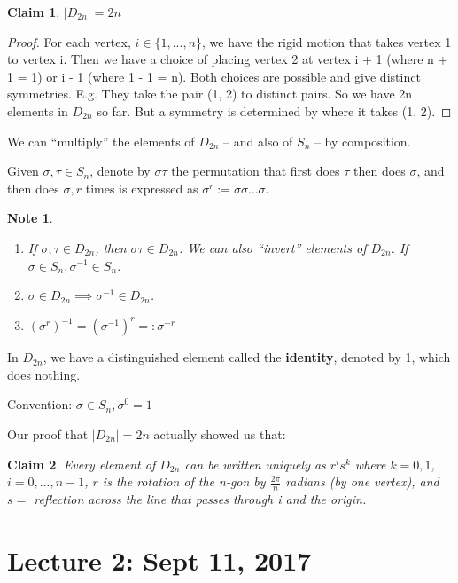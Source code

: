 \documentclass[11pt, oneside]{book}
\theoremstyle{break}
\newtheorem*{proof}{Proof}
\newtheorem{claim}{Claim}[section]
\newtheorem*{note}{Note}
\begin{document}
\begin{claim}
	$|D_{2n}| = 2n$
\end{claim}

\begin{proof}
	For each vertex, $i \in \{1, ..., n\}$, we have the rigid motion that takes vertex 1 to vertex i. Then we have a choice of placing vertex 2 at vertex i + 1 (where n + 1 = 1) or i - 1 (where 1 - 1 = n). Both choices are possible and give distinct symmetries. E.g. They take the pair (1, 2) to distinct pairs. So we have 2n elements in $D_{2n}$ so far. But a symmetry is determined by where it takes (1, 2).
\end{proof}

We can ``multiply'' the elements of $D_{2n}$ -- and also of $S_n$ -- by composition.

Given $\sigma, \tau \in S_n$, denote by $\sigma\tau$ the permutation that first does $\tau$ then does $\sigma$, and then does $\sigma, r$ times is expressed as
$\sigma^r := \sigma\sigma\hdots\sigma$.

\begin{note}
    \begin{enumerate}
        \item If $\sigma, \tau \in D_{2n}$, then $\sigma\tau \in D_{2n}$. We can also ``invert'' elements of $D_{2n}$. If $\sigma \in S_n, \sigma^{-1} \in S_n$.
        \item $\sigma \in D_{2n} \implies \sigma^{-1} \in D_{2n}$.
        \item $(\sigma^r)^{-1} = (\sigma^{-1})^r =: \sigma^{-r}$
    \end{enumerate}
\end{note}

In $D_{2n}$, we have a distinguished element called the \textbf{identity}, denoted by 1, which does nothing.

Convention: $\sigma \in S_n, \sigma^0 = 1$

Our proof that $|D_{2n}| = 2n$ actually showed us that:

\begin{claim}
    Every element of $D_{2n}$ can be written uniquely as $r^i s^k$ where $k = 0, 1$, $i = 0, ..., n - 1$, $r$ is the rotation of the n-gon by $\frac{2\pi}{n}$ radians (by one vertex), and $s =$ reflection across the line that passes through i and the origin.
\end{claim}

\chapter{Lecture 2: Sept 11, 2017}\label{lec2}
\end{document}
